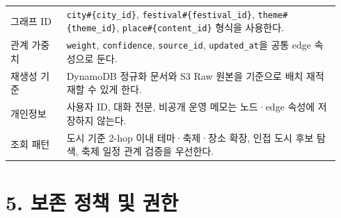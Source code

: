 \documentclass[12pt,a4paper]{article}
\newcommand{\DocNeedspace}[1]{\par\ifdim\dimexpr\pagegoal-\pagetotal\relax<#1\newpage\fi}
\begin{document}
\DocNeedspace{16\baselineskip}
\begin{small}
\begin{longtable}{@{}>{\centering\arraybackslash}m{0.160\linewidth}>{\RaggedRight\arraybackslash}m{0.780\linewidth}@{}}
\toprule
\multicolumn{1}{>{\centering\arraybackslash}m{0.160\linewidth}}{\textbf{기준}} & \multicolumn{1}{>{\centering\arraybackslash}m{0.780\linewidth}}{\textbf{결정}} \\
\midrule
\endhead
그래프 ID & \texttt{city\#\allowbreak{}\{\allowbreak{}city\_\allowbreak{}id\allowbreak{}\}}, \texttt{festival\#\allowbreak{}\{\allowbreak{}festival\_\allowbreak{}id\allowbreak{}\}}, \texttt{theme\#\allowbreak{}\{\allowbreak{}theme\_\allowbreak{}id\allowbreak{}\}}, \texttt{place\#\allowbreak{}\{\allowbreak{}content\_\allowbreak{}id\allowbreak{}\}} 형식을 사용한다. \\
관계 가중치 & \texttt{weight}, \texttt{confidence}, \texttt{source\_\allowbreak{}id}, \texttt{updated\_\allowbreak{}at}을 공통 edge 속성으로 둔다. \\
재생성 기준 & DynamoDB 정규화 문서와 S3 Raw 원본을 기준으로 배치 재적재할 수 있게 한다. \\
개인정보 & 사용자 ID, 대화 전문, 비공개 운영 메모는 노드·edge 속성에 저장하지 않는다. \\
조회 패턴 & 도시 기준 2-hop 이내 테마·축제·장소 확장, 인접 도시 후보 탐색, 축제 일정 관계 검증을 우선한다. \\
\bottomrule
\end{longtable}
\end{small}


\newpage

\DocNeedspace{10\baselineskip}
\section*{5. 보존 정책 및 권한}
\end{document}
